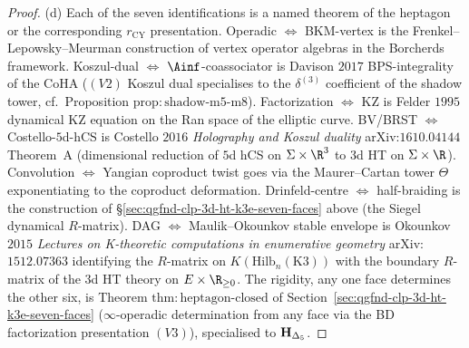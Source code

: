 \begin{proof}
(d) Each of the seven identifications is a named theorem of the
heptagon or the corresponding $r_{\mathrm{CY}}$ presentation.
Operadic $\Leftrightarrow$ BKM-vertex is the Frenkel--Lepowsky--Meurman
construction of vertex operator algebras in the Borcherds framework.
Koszul-dual $\Leftrightarrow$ $\Ainf$-coassociator is Davison $2017$
BPS-integrality of the CoHA ($(V2)$ Koszul dual specialises to the
$\delta^{(3)}$ coefficient of the shadow tower, cf.\ Proposition
$\mathrm{prop:shadow\text{-}m5\text{-}m8}$).
Factorization $\Leftrightarrow$ KZ is Felder $1995$ dynamical KZ
equation on the Ran space of the elliptic curve.
BV/BRST $\Leftrightarrow$ Costello-$5$d-hCS is Costello $2016$
\textit{Holography and Koszul duality} arXiv:$1610.04144$ Theorem~A
(dimensional reduction of $5$d hCS on $\Sigma\times\R^3$ to $3$d HT
on $\Sigma\times\R$).
Convolution $\Leftrightarrow$ Yangian coproduct twist goes via the
Maurer--Cartan tower $\Theta$ exponentiating to the coproduct
deformation.
Drinfeld-centre $\Leftrightarrow$ half-braiding is the construction
of \S\ref{sec:qgfnd-clp-3d-ht-k3e-seven-faces} above (the Siegel
dynamical $R$-matrix).
DAG $\Leftrightarrow$ Maulik--Okounkov stable envelope is
Okounkov $2015$ \textit{Lectures on K-theoretic computations in
enumerative geometry} arXiv:$1512.07363$ identifying the $R$-matrix
on $K(\mathrm{Hilb}_n(\mathrm{K3}))$ with the boundary $R$-matrix of
the $3$d HT theory on $E\times\R_{\geq 0}$.
The rigidity, any one face determines the other six, is Theorem
$\mathrm{thm:heptagon\text{-}closed}$ of
Section~\ref{sec:qgfnd-clp-3d-ht-k3e-seven-faces} ($\infty$-operadic determination from any face via the
BD factorization presentation $(V3)$), specialised to $\mathbf{H}_{\Delta_5}$.
\end{proof}


